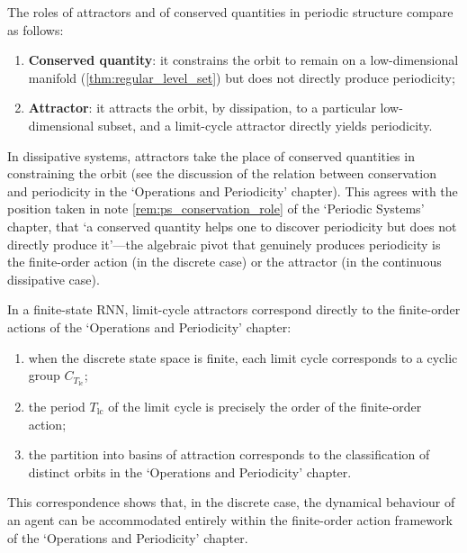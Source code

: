 \begin{remark}\label{rem:attractor_vs_conservation}
The roles of attractors and of conserved quantities in periodic structure compare as follows:
\begin{enumerate}[label=(\roman*)]
    \item \textbf{Conserved quantity}: it constrains the orbit to remain on a low-dimensional manifold (\cref{thm:regular_level_set}) but does not directly produce periodicity;
    \item \textbf{Attractor}: it attracts the orbit, by dissipation, to a particular low-dimensional subset, and a limit-cycle attractor directly yields periodicity.
\end{enumerate}
In dissipative systems, attractors take the place of conserved quantities in constraining the orbit (see the discussion of the relation between conservation and periodicity in the `Operations and Periodicity' chapter). This agrees with the position taken in note \ref{rem:ps_conservation_role} of the `Periodic Systems' chapter, that `a conserved quantity helps one to discover periodicity but does not directly produce it'---the algebraic pivot that genuinely produces periodicity is the finite-order action (in the discrete case) or the attractor (in the continuous dissipative case).
\end{remark}

\begin{remark}\label{rem:attractor_finite_order}
In a finite-state RNN, limit-cycle attractors correspond directly to the finite-order actions of the `Operations and Periodicity' chapter:
\begin{enumerate}[label=(\roman*)]
    \item when the discrete state space is finite, each limit cycle corresponds to a cyclic group $C_{T_{\text{lc}}}$;
    \item the period $T_{\text{lc}}$ of the limit cycle is precisely the order of the finite-order action;
    \item the partition into basins of attraction corresponds to the classification of distinct orbits in the `Operations and Periodicity' chapter.
\end{enumerate}
This correspondence shows that, in the discrete case, the dynamical behaviour of an agent can be accommodated entirely within the finite-order action framework of the `Operations and Periodicity' chapter.
\end{remark}

